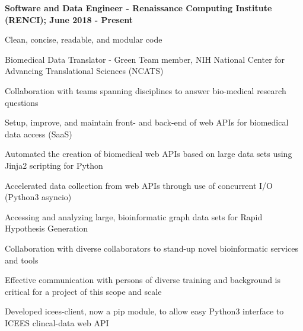 \documentclass[letterpaper,final]{memoir}
\newcommand{\Sep}{\vspace{1.0em}}
\newcommand{\SmallSep}{\vspace{0.4em}}
\newcommand{\CVItem}[1]
	{\textbf{\color{Blue} #1}}
\begin{document}
\CVItem{Software and Data Engineer - Renaissance Computing Institute (RENCI); June 2018 - Present}
\begin{compactitem}[\color{Blue}$\circ$]
    
    \SmallSep
    \item Clean, concise, readable, and modular code
    
    \item Biomedical Data Translator - Green Team member, NIH National Center for Advancing Translational Sciences (NCATS)
    
    \item Collaboration with teams spanning disciplines to answer bio-medical research questions
    
    \item Setup, improve, and maintain front- and back-end of web APIs for biomedical data access (SaaS)
    
    \item Automated the creation of biomedical web APIs based on large data sets using Jinja2 scripting for Python
    
    \item Accelerated data collection from web APIs through use of concurrent I/O (Python3 asyncio)
    
    \item Accessing and analyzing large, bioinformatic graph data sets for Rapid Hypothesis Generation
    
    \item Collaboration with diverse collaborators to stand-up novel bioinformatic services and tools
    
    \item Effective communication with persons of diverse training and background is critical for a project of this scope and scale
    
    \item Developed icees-client, now a pip module, to allow easy Python3 interface to ICEES clincal-data web API    

\end{compactitem}

\Sep
\end{document}
